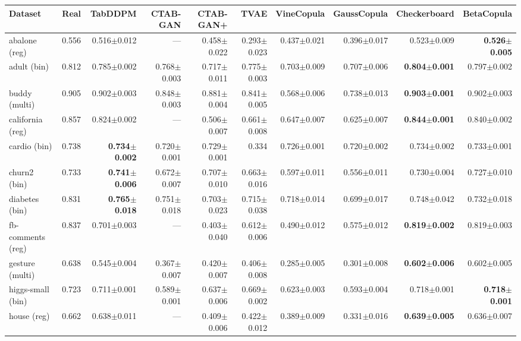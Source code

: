 \begingroup\setlength{\tabcolsep}{1.2pt}
\begin{tabular}{lrrrrrrrrr}
\toprule
Dataset & Real & TabDDPM & CTAB-GAN & CTAB-GAN+ & TVAE & VineCopula & GaussCopula & Checkerboard & BetaCopula \\
\midrule
abalone (reg) & 0.556 & 0.516$\pm$0.012 & --- & 0.458$\pm$0.022 & 0.293$\pm$0.023 & 0.437$\pm$0.021 & 0.396$\pm$0.017 & 0.523$\pm$0.009 & \textbf{0.526$\pm$0.005} \\
adult (bin) & 0.812 & 0.785$\pm$0.002 & 0.768$\pm$0.003 & 0.717$\pm$0.011 & 0.775$\pm$0.003 & 0.703$\pm$0.009 & 0.707$\pm$0.006 & \textbf{0.804$\pm$0.001} & 0.797$\pm$0.002 \\
buddy (multi) & 0.905 & 0.902$\pm$0.003 & 0.848$\pm$0.003 & 0.881$\pm$0.004 & 0.841$\pm$0.005 & 0.568$\pm$0.006 & 0.738$\pm$0.013 & \textbf{0.903$\pm$0.001} & 0.902$\pm$0.003 \\
california (reg) & 0.857 & 0.824$\pm$0.002 & --- & 0.506$\pm$0.007 & 0.661$\pm$0.008 & 0.647$\pm$0.007 & 0.625$\pm$0.007 & \textbf{0.844$\pm$0.001} & 0.840$\pm$0.002 \\
cardio (bin) & 0.738 & \textbf{0.734$\pm$0.002} & 0.720$\pm$0.001 & 0.729$\pm$0.001 & 0.334 & 0.726$\pm$0.001 & 0.720$\pm$0.002 & 0.734$\pm$0.002 & 0.733$\pm$0.001 \\
churn2 (bin) & 0.733 & \textbf{0.741$\pm$0.006} & 0.672$\pm$0.007 & 0.707$\pm$0.010 & 0.663$\pm$0.016 & 0.597$\pm$0.011 & 0.556$\pm$0.011 & 0.730$\pm$0.004 & 0.727$\pm$0.010 \\
diabetes (bin) & 0.831 & \textbf{0.765$\pm$0.018} & 0.751$\pm$0.018 & 0.703$\pm$0.023 & 0.715$\pm$0.038 & 0.718$\pm$0.014 & 0.699$\pm$0.017 & 0.748$\pm$0.042 & 0.732$\pm$0.018 \\
fb-comments (reg) & 0.837 & 0.701$\pm$0.003 & --- & 0.403$\pm$0.040 & 0.612$\pm$0.006 & 0.490$\pm$0.012 & 0.575$\pm$0.012 & \textbf{0.819$\pm$0.002} & 0.819$\pm$0.003 \\
gesture (multi) & 0.638 & 0.545$\pm$0.004 & 0.367$\pm$0.007 & 0.420$\pm$0.007 & 0.406$\pm$0.008 & 0.285$\pm$0.005 & 0.301$\pm$0.008 & \textbf{0.602$\pm$0.006} & 0.602$\pm$0.005 \\
higgs-small (bin) & 0.723 & 0.711$\pm$0.001 & 0.589$\pm$0.001 & 0.637$\pm$0.006 & 0.669$\pm$0.002 & 0.623$\pm$0.003 & 0.593$\pm$0.004 & 0.718$\pm$0.001 & \textbf{0.718$\pm$0.001} \\
house (reg) & 0.662 & 0.638$\pm$0.011 & --- & 0.409$\pm$0.006 & 0.422$\pm$0.012 & 0.389$\pm$0.009 & 0.331$\pm$0.016 & \textbf{0.639$\pm$0.005} & 0.636$\pm$0.007 \\

\end{tabular}
